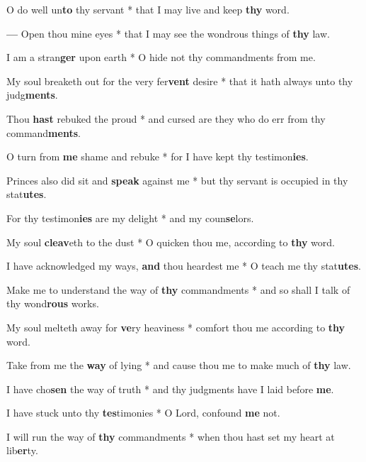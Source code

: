 \begin{multicols}{2}
	O do well un\textbf{to} thy servant * that I may live and keep \textbf{thy} word.
	
	\textbf{---} Open thou mine eyes * that I may see the wondrous things of \textbf{thy} law.
	
	I am a stran\textbf{ger} upon earth * O hide not thy commandments from me.
	
	My soul breaketh out for the very fer\textbf{vent} desire * that it hath always unto thy judg\textbf{ments}.
	
	Thou \textbf{hast} rebuked the proud * and cursed are they who do err from thy command\textbf{ments}.
	
	O turn from \textbf{me} shame and rebuke * for I have kept thy testimon\textbf{ies}.
	
	Princes also did sit and \textbf{speak} against me * but thy servant is occupied in thy stat\textbf{utes}.
	
	For thy testimon\textbf{ies} are my delight * and my coun\textbf{se}lors.
	
	My soul \textbf{cleav}eth to the dust * O quicken thou me, according to \textbf{thy} word.
	
	I have acknowledged my ways, \textbf{and} thou heardest me * O teach me thy stat\textbf{utes}.
	
	Make me to understand the way of \textbf{thy} commandments * and so shall I talk of thy wond\textbf{rous} works.
	
	My soul melteth away for \textbf{ve}ry heaviness * comfort thou me according to \textbf{thy} word.
	
	Take from me the \textbf{way} of lying * and cause thou me to make much of \textbf{thy} law.
	
	I have cho\textbf{sen} the way of truth * and thy judgments have I laid before \textbf{me}.
	
	I have stuck unto thy \textbf{tes}timonies * O Lord, confound \textbf{me} not.
	
	I will run the way of \textbf{thy} commandments * when thou hast set my heart at lib\textbf{er}ty.
\end{multicols}